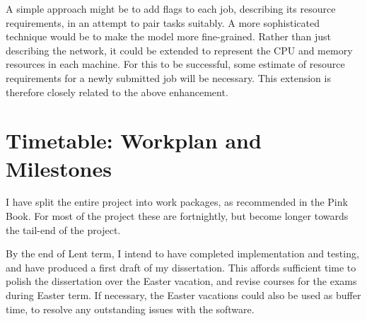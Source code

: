 \begin{itemize}
        A simple approach might be to add flags to each job, describing its resource requirements, in an attempt to pair tasks suitably. A more sophisticated technique would be to make the model more fine-grained. Rather than just describing the network, it could be extended to represent the CPU and memory resources in each machine. For this to be successful, some estimate of resource requirements for a newly submitted job will be necessary. This extension is therefore closely related to the above enhancement.

\end{itemize}



\section*{Timetable: Workplan and Milestones}

I have split the entire project into work packages, as recommended in the Pink Book. For most of the project these are fortnightly, but become longer towards the tail-end of the project.

By the end of Lent term, I intend to have completed implementation and testing, and have produced a first draft of my dissertation. This affords sufficient time to polish the dissertation over the Easter vacation, and revise courses for the exams during Easter term. If necessary, the Easter vacations could also be used as buffer time, to resolve any outstanding issues with the software. 

\newcommand{\workpackage}[3]{\item \textbf{#1} #2 #3}
\newcommand{\milestone}[1]{\textbf{Milestone:} #1}
\newcommand{\wpstartfill}[0]{\hfill \\ \\}
\newcommand{\wpendfill}[0]{\hfill \\}


